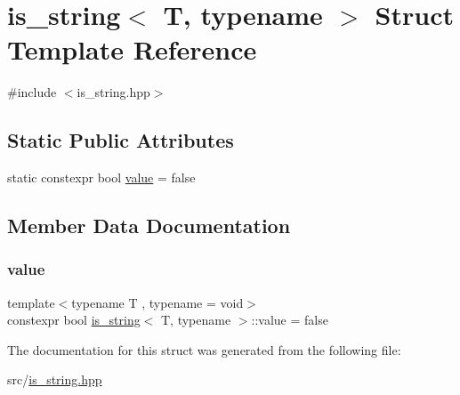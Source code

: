 \hypertarget{structis__string}{}\section{is\+\_\+string$<$ T, typename $>$ Struct Template Reference}
\label{structis__string}


{\ttfamily \#include $<$is\+\_\+string.\+hpp$>$}

\subsection*{Static Public Attributes}
\begin{DoxyCompactItemize}
\item 
static constexpr bool \hyperlink{structis__string_a3832f7471ae89c5903a6242e4e2517d7}{value} = false
\end{DoxyCompactItemize}


\subsection{Member Data Documentation}
\mbox{\label{structis__string_a3832f7471ae89c5903a6242e4e2517d7}} 
\subsubsection{\texorpdfstring{value}{value}}
{\footnotesize\ttfamily template$<$typename T , typename  = void$>$ \\
constexpr bool \hyperlink{structis__string}{is\+\_\+string}$<$ T, typename $>$\+::value = false\hspace{0.3cm}{\ttfamily [static]}}



The documentation for this struct was generated from the following file\+:\begin{DoxyCompactItemize}
\item 
src/\hyperlink{is__string_8hpp}{is\+\_\+string.\+hpp}\end{DoxyCompactItemize}
